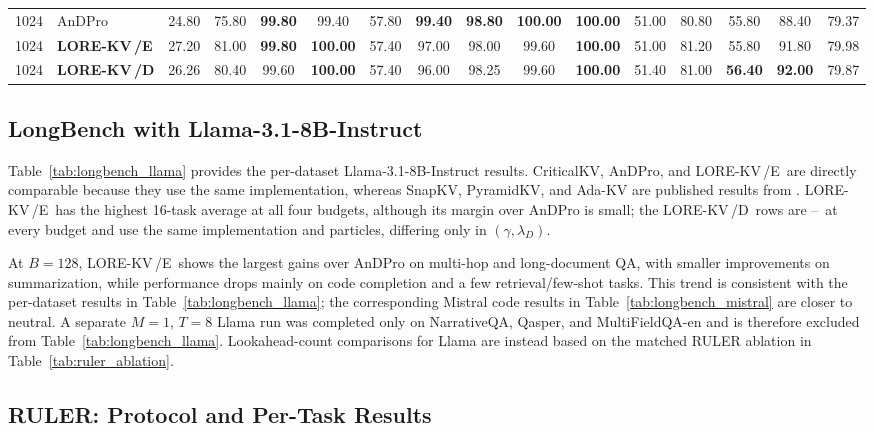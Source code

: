 \documentclass{article} %
\newcommand{\best}[1]{\textcolor{bestblue}{\textbf{#1}}}
\newcommand{\second}[1]{\textcolor{secondorange}{#1}}
\newcommand{\tbd}{\textcolor{red}{--}}
\newcommand{\lorekvE}{LORE-KV\,/E}
\newcommand{\lorekvD}{LORE-KV\,/D}
\begin{document}
\begin{table}[p]
{\begin{tabular}{llcccccccccccccc}
1024 & AnDPro & 24.80 & 75.80 & \best{99.80} & \second{99.40} & \second{57.80} & \best{99.40} & \best{98.80} & \best{100.00} & \best{100.00} & 51.00 & 80.80 & \second{55.80} & 88.40 & 79.37 \\
1024 & \textbf{\lorekvE} & \second{27.20} & \second{81.00} & \best{99.80} & \best{100.00} & 57.40 & \second{97.00} & 98.00 & \second{99.60} & \best{100.00} & 51.00 & \second{81.20} & \second{55.80} & \second{91.80} & \second{79.98} \\
1024 & \textbf{\lorekvD} & 26.26 & 80.40 & \second{99.60} & \best{100.00} & 57.40 & 96.00 & \second{98.25} & \second{99.60} & \best{100.00} & \second{51.40} & 81.00 & \best{56.40} & \best{92.00} & 79.87 \\
\bottomrule
\end{tabular}%
}
\end{table}

\subsection{LongBench with Llama-3.1-8B-Instruct}
\label{app:llama_results}

Table~\ref{tab:longbench_llama} provides the per-dataset Llama-3.1-8B-Instruct results. CriticalKV, AnDPro, and \lorekvE\ are directly comparable because they use the same implementation, whereas SnapKV, PyramidKV, and Ada-KV are published results from \citet{geng2026accurate}. \lorekvE\ has the highest 16-task average at all four budgets, although its margin over AnDPro is small; the \lorekvD\ rows are \tbd\ at every budget and use the same implementation and particles, differing only in $(\gamma,\lambda_D)$.



At $B{=}128$, \lorekvE\ shows the largest gains over AnDPro on multi-hop and long-document QA, with smaller improvements on summarization, while performance drops mainly on code completion and a few retrieval/few-shot tasks. This trend is consistent with the per-dataset results in Table~\ref{tab:longbench_llama}; the corresponding Mistral code results in Table~\ref{tab:longbench_mistral} are closer to neutral. A separate $M{=}1$, $T{=}8$ Llama run was completed only on NarrativeQA, Qasper, and MultiFieldQA-en and is therefore excluded from Table~\ref{tab:longbench_llama}. Lookahead-count comparisons for Llama are instead based on the matched RULER ablation in Table~\ref{tab:ruler_ablation}.

\subsection{RULER: Protocol and Per-Task Results} \label{app:ruler_results}
\end{document}
